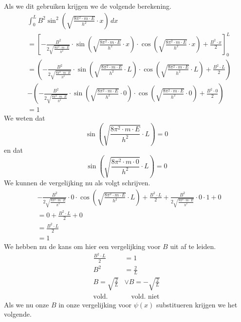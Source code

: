\documentclass[11pt,fleqn]{book} %
\begin{document}
Als we dit gebruiken krijgen we de volgende berekening.
\begin{align*}
&\int_0^L B^2\sin^2{\left(\sqrt{\frac{8\pi^2\cdot m\cdot E}{h^2}}\cdot x\right)}\,dx\\
&= \left[-\frac{B^2}{2\sqrt{\frac{8\pi^2\cdot m\cdot E}{h^2}}}\cdot\sin{\left(\sqrt{\frac{8\pi^2\cdot m\cdot E}{h^2}}\cdot x\right)}\cdot\cos{\left(\sqrt{\frac{8\pi^2\cdot m\cdot E}{h^2}}\cdot x\right)}+\frac{B^2\cdot x}{2}\right]_0^L\\
&=\left(-\frac{B^2}{2\sqrt{\frac{8\pi^2\cdot m\cdot E}{h^2}}}\cdot\sin{\left(\sqrt{\frac{8\pi^2\cdot m\cdot E}{h^2}}\cdot L\right)}\cdot\cos{\left(\sqrt{\frac{8\pi^2\cdot m\cdot E}{h^2}}\cdot L\right)}+\frac{B^2\cdot L}{2}\right)\\
&- \left(-\frac{B^2}{2\sqrt{\frac{8\pi^2\cdot m\cdot E}{h^2}}}\cdot\sin{\left(\sqrt{\frac{8\pi^2\cdot m\cdot E}{h^2}}\cdot 0\right)}\cdot\cos{\left(\sqrt{\frac{8\pi^2\cdot m\cdot E}{h^2}}\cdot 0\right)}+\frac{B^2\cdot 0}{2}\right)\\
&= 1
\end{align*}
We weten dat
\begin{displaymath}
\sin{\left(\sqrt{\frac{8\pi^2\cdot m\cdot E}{h^2}}\cdot L\right)}=0
\end{displaymath}
en dat
\begin{displaymath}
\sin{\left(\sqrt{\frac{8\pi^2\cdot m\cdot 0}{h^2}}\cdot L\right)}=0
\end{displaymath}
We kunnen de vergelijking nu als volgt schrijven.
\begin{align*}
&-\frac{B^2}{2\sqrt{\frac{8\pi^2\cdot m\cdot E}{h^2}}}\cdot 0\cdot\cos{\left(\sqrt{\frac{8\pi^2\cdot m\cdot E}{h^2}}\cdot L\right)}+\frac{B^2\cdot L}{2}+\frac{B^2}{2\sqrt{\frac{8\pi^2\cdot m\cdot E}{h^2}}}\cdot 0\cdot 1+0\\
&= 0+\frac{B^2\cdot L}{2}+0\\
&= \frac{B^2\cdot L}{2}\\
&= 1
\end{align*}
We hebben nu de kans om hier een vergelijking voor $B$ uit af te leiden.
\begin{align*}
\frac{B^2\cdot L}{2} &=1\\
B^2 &=\frac{2}{L}\\
B = \sqrt{\frac{2}{L}} &\vee B = -\sqrt{\frac{2}{L}}\\
\text{vold.} &\quad \text{vold. niet}
\end{align*}
Als we nu onze $B$ in onze vergelijking voor $\psi(x)$ substitueren krijgen we het volgende.
\end{document}
